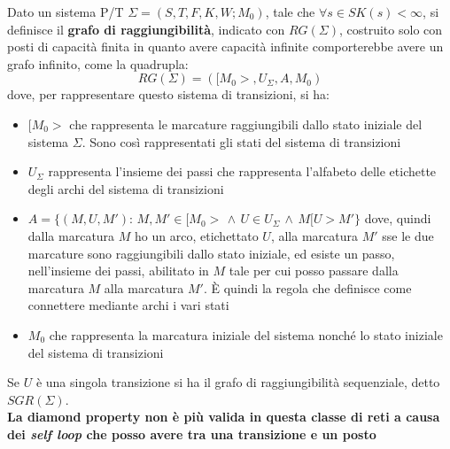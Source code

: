 \documentclass[a4paper,12pt, oneside]{book}
\begin{document}
\begin{definizione}
  Dato un sistema P/T $\Sigma=(S, T , F , K , W;M_0)$, tale che $\forall s\in S
  K(s)<\infty$, si definisce il \textbf{grafo di raggiungibilità}, indicato con
  $RG(\Sigma)$, costruito solo con posti di capacità finita in quanto avere
  capacità infinite comporterebbe avere un grafo infinito, come la quadrupla:
  \[RG(\Sigma)=([M_0 >, U_\Sigma , A, M_0 )\]
  dove, per rappresentare questo sistema di transizioni, si ha:
  \begin{itemize}
    \item $[M_0>$ che rappresenta le marcature raggiungibili dallo stato iniziale
    del sistema $\Sigma$. Sono così rappresentati gli stati del sistema di
    transizioni  
    \item $U_\Sigma$ rappresenta l'insieme dei passi che rappresenta l'alfabeto
    delle etichette degli archi
    del sistema di transizioni
    \item $A=\{(M,U,M'):\,M,M'\in [M_0>\,\wedge\, U\in U_\Sigma \,\wedge\,
    M[U>M'\}$ dove, quindi dalla marcatura $M$ ho un arco, etichettato $U$, alla
    marcatura $M'$ sse le due marcature sono raggiungibili dallo stato iniziale,
    ed esiste un passo, nell'insieme dei passi, abilitato in $M$ tale per cui
    posso passare dalla marcatura $M$ alla marcatura $M'$. È quindi la regola
    che definisce come connettere mediante archi i vari stati
    \item $M_0$ che rappresenta la marcatura iniziale del sistema nonché lo
    stato iniziale del sistema di transizioni
  \end{itemize}
  Se $U$ è una singola transizione si ha il grafo di raggiungibilità
  sequenziale, detto $SGR(\Sigma)$.\\
  \textbf{La diamond property non è più valida in questa classe di reti a causa
    dei \emph{self loop} che posso avere tra una transizione e un posto}
\end{definizione}
\end{document}
